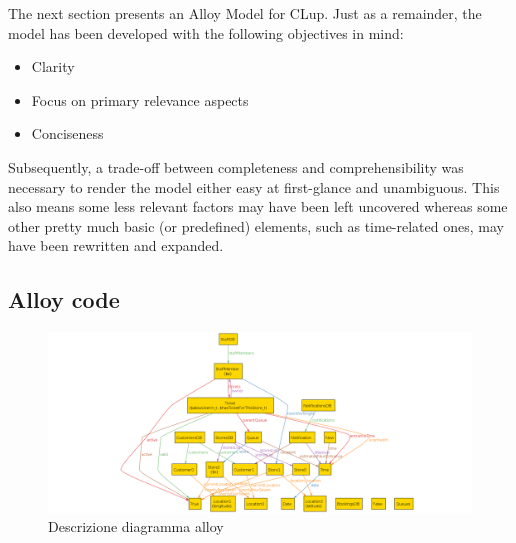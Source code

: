 The next section presents an Alloy Model for CLup. Just as a remainder, the model has been developed with the following objectives in mind: \newline

\begin{itemize}
    \item Clarity
    \item Focus on primary relevance aspects
    \item Conciseness
\end{itemize}

Subsequently, a trade-off between completeness and comprehensibility was necessary to render the model either easy at first-glance and unambiguous. \newline 
This also means some less relevant factors may have been left uncovered whereas some other pretty much basic (or predefined) elements, such as time-related ones, may have been rewritten and expanded. \newline 


{\color{gray}
}



\subsection{Alloy code \label{alloy_code}}






\begin{figure} [H]
	\includegraphics[width=\linewidth]{../Alloy/allowedInStaff.png}
	\caption{Descrizione diagramma alloy}
	\label{fig:AlloyTag1}
\end{figure}

